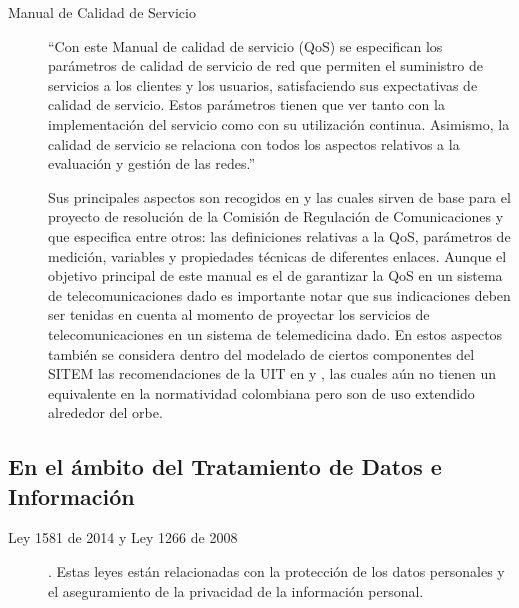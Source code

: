 \begin{description}
\item [Manual de Calidad de Servicio] “Con este Manual de calidad de servicio (QoS) se especifican los parámetros de calidad de servicio de red que permiten el suministro de servicios a los clientes y los usuarios, satisfaciendo sus expectativas de calidad de servicio. Estos parámetros tienen que ver tanto con la implementación del servicio como con su utilización continua. Asimismo, la calidad de servicio se relaciona con todos los aspectos relativos a la evaluación y gestión de las redes.”\cite{ITU2004}

Sus principales aspectos son recogidos en \cite{crtcondiciones} y \cite{crtindicadores}  las cuales sirven de base para el proyecto de resolución\cite{crtqos} de la Comisión de Regulación de Comunicaciones y que especifica entre otros: las definiciones relativas a la QoS, parámetros de medición, variables y propiedades técnicas de diferentes enlaces. Aunque el objetivo principal de este manual es el de garantizar la QoS en un sistema de telecomunicaciones dado es importante notar que sus indicaciones deben ser tenidas en cuenta al momento de proyectar los servicios de telecomunicaciones en un sistema de telemedicina dado. En estos aspectos también se considera dentro del modelado de ciertos componentes del SITEM las recomendaciones de la UIT en \cite{ITUG1000} y \cite{ITUG1010}, las cuales aún no tienen un equivalente en la normatividad colombiana pero son de uso extendido alrededor del orbe.

\end{description}

\subsection{En el ámbito del Tratamiento de Datos e Información}  

\begin{description}
 \item[Ley 1581 de 2014 y Ley 1266 de 2008]. Estas leyes están relacionadas con la protección de los datos personales y el aseguramiento de la privacidad de la información personal.
 
\end{description}